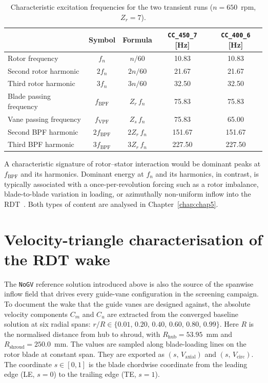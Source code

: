 \begin{table}[H]
\centering
\caption{Characteristic excitation frequencies for the two transient runs ($n = 650$~rpm, $Z_r=7$).}
\label{tab:characteristic_freqs}
\begin{tabular}{lcccc}
\hline
 & Symbol & Formula & \texttt{CC\_450\_7} [Hz] & \texttt{CC\_400\_6} [Hz] \\ \hline
Rotor frequency           & $f_n$               & $n/60$         & 10.83  & 10.83  \\
Second rotor harmonic     & $2f_n$              & $2n/60$        & 21.67  & 21.67  \\
Third rotor harmonic      & $3f_n$              & $3n/60$        & 32.50  & 32.50  \\
Blade passing frequency   & $f_{\mathrm{BPF}}$  & $Z_r\,f_n$     & 75.83  & 75.83  \\
Vane passing frequency    & $f_{\mathrm{VPF}}$  & $Z_s\,f_n$     & 75.83  & 65.00  \\
Second BPF harmonic       & $2f_{\mathrm{BPF}}$ & $2Z_r\,f_n$    & 151.67 & 151.67 \\
Third BPF harmonic        & $3f_{\mathrm{BPF}}$ & $3Z_r\,f_n$    & 227.50 & 227.50 \\ \hline
\end{tabular}
\end{table}
 
A characteristic signature of rotor--stator interaction would be dominant peaks at $f_{\mathrm{BPF}}$ and its harmonics. Dominant energy at $f_n$ and its harmonics, in contrast, is typically associated with a once-per-revolution forcing such as a rotor imbalance, blade-to-blade variation in loading, or azimuthally non-uniform inflow into the RDT~\cite{Brekke2015,Bergan2018}. Both types of content are analysed in Chapter~\ref{chap:chap5}.

\section{Velocity-triangle characterisation of the RDT wake}
\label{sec:methods_rdt_velocity_triangles}
 
The \texttt{NoGV} reference solution introduced above is also the source of the spanwise inflow field that drives every guide-vane configuration in the screening campaign. To document the wake that the guide vanes are designed against, the absolute velocity components $C_m$ and $C_u$ are extracted from the converged baseline solution at six radial spans: $r/R \in \{0.01,\,0.20,\,0.40,\,0.60,\,0.80,\,0.99\}$. Here $R$ is the normalised distance from hub to shroud, with $R_{\mathrm{hub}}=53.95$~mm and $R_{\mathrm{shroud}}=250.0$~mm. The values are sampled along blade-loading lines on the rotor blade at constant span. They are exported as $(s,\,V_{\mathrm{axial}})$ and $(s,\,V_{\mathrm{circ}})$. The coordinate $s\in[0,1]$ is the blade chordwise coordinate from the leading edge (LE, $s=0$) to the trailing edge (TE, $s=1$).
 
